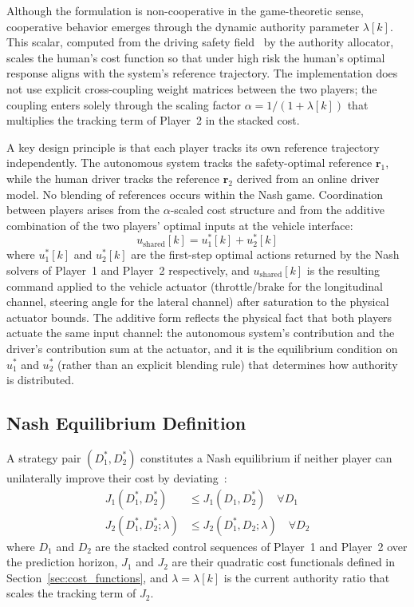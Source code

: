 \documentclass[12pt,a4paper,oneside]{report}
\begin{document}
Although the formulation is non-cooperative in the game-theoretic sense, cooperative behavior emerges through the dynamic authority parameter $\lambda[k]$. This scalar, computed from the driving safety field~\cite{wangDrivingSafetyField2015, wangDrivingSafetyField2016} by the authority allocator, scales the human's cost function so that under high risk the human's optimal response aligns with the system's reference trajectory. The implementation does not use explicit cross-coupling weight matrices between the two players; the coupling enters solely through the scaling factor $\alpha = 1/(1+\lambda[k])$ that multiplies the tracking term of Player~2 in the stacked cost.

A key design principle is that each player tracks its own reference trajectory independently. The autonomous system tracks the safety-optimal reference $\mathbf{r}_1$, while the human driver tracks the reference $\mathbf{r}_2$ derived from an online driver model. No blending of references occurs within the Nash game. Coordination between players arises from the $\alpha$-scaled cost structure and from the additive combination of the two players' optimal inputs at the vehicle interface:
\begin{equation}
u_{\text{shared}}[k] = u_1^{*}[k] + u_2^{*}[k]
\label{eq:shared_control_ch4}
\end{equation}
where $u_1^{*}[k]$ and $u_2^{*}[k]$ are the first-step optimal actions returned by the Nash solvers of Player~1 and Player~2 respectively, and $u_{\text{shared}}[k]$ is the resulting command applied to the vehicle actuator (throttle/brake for the longitudinal channel, steering angle for the lateral channel) after saturation to the physical actuator bounds. The additive form reflects the physical fact that both players actuate the same input channel: the autonomous system's contribution and the driver's contribution sum at the actuator, and it is the equilibrium condition on $u_1^{*}$ and $u_2^{*}$ (rather than an explicit blending rule) that determines how authority is distributed.

\subsection{Nash Equilibrium Definition}

A strategy pair $(D_1^{*}, D_2^{*})$ constitutes a Nash equilibrium if neither player can unilaterally improve their cost by deviating~\cite{jondConnectedAutomatedVehicle2023}:
\begin{align}
J_1(D_1^{*}, D_2^{*}) &\leq J_1(D_1, D_2^{*}) \quad \forall D_1 \label{eq:nash_def_1}\\
J_2(D_1^{*}, D_2^{*}; \lambda) &\leq J_2(D_1^{*}, D_2; \lambda) \quad \forall D_2 \label{eq:nash_def_2}
\end{align}
where $D_1$ and $D_2$ are the stacked control sequences of Player~1 and Player~2 over the prediction horizon, $J_1$ and $J_2$ are their quadratic cost functionals defined in Section~\ref{sec:cost_functions}, and $\lambda = \lambda[k]$ is the current authority ratio that scales the tracking term of $J_2$.
\end{document}
